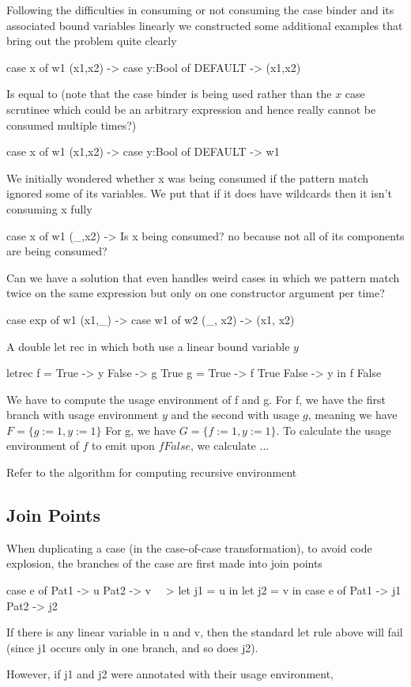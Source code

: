 \documentclass[a4paper, draft]{article}
\begin{document}
Following the difficulties in consuming or not consuming the case binder and its
associated bound variables linearly we constructed some additional examples that
bring out the problem quite clearly
\begin{code}
case x of w1
    (x1,x2) -> case y:Bool of
                DEFAULT -> (x1,x2)
\end{code}
Is equal to (note that the case binder is being used rather than the $x$ case
scrutinee which could be an arbitrary expression and hence really cannot be
consumed multiple times?)
\begin{code}
case x of w1
    (x1,x2) -> case y:Bool of
                DEFAULT -> w1
\end{code}

We initially wondered whether x was being consumed if the pattern match ignored
some of its variables. We put that if it does have wildcards then it isn't
consuming x fully
\begin{code}
case x of w1
    (_,x2) -> Is x being consumed? no because not all of its components are
    being consumed?
\end{code}

Can we have a solution that even handles weird cases in which we pattern match
twice on the same expression but only on one constructor argument per time?
\begin{code}
case exp of w1
    (x1,_) -> case w1 of w2
                (_, x2) -> (x1, x2)
\end{code}

A double let rec in which both use a linear bound variable $y$
\begin{code}
letrec f = \case
        True  -> y
        False -> g True
       g = \case
        True -> f True
        False -> y
    in f False
\end{code}

We have to compute the usage environment of f and g.
For f, we have the first branch with usage environment $y$ and the second with
usage $g$, meaning we have $F = \{g := 1, y := 1\}$
For g, we have $G = \{f := 1, y := 1\}$. To calculate the usage environment of
$f$ to emit upon $f False$, we calculate ...

Refer to the algorithm for computing recursive environment


\subsection{Join Points}

When duplicating a case (in the case-of-case transformation), to avoid code
explosion, the branches of the case are first made into join points

\begin{code}
case e of
  Pat1 -> u
  Pat2 -> v
~~>
let j1 = u in
let j2 = v in
case e of
  Pat1 -> j1
  Pat2 -> j2
\end{code}

If there is any linear variable in u and v, then the standard
let rule above will fail (since j1 occurs only in one branch, and
so does j2).

However, if j1 and j2 were annotated with their usage environment,
\end{document}
